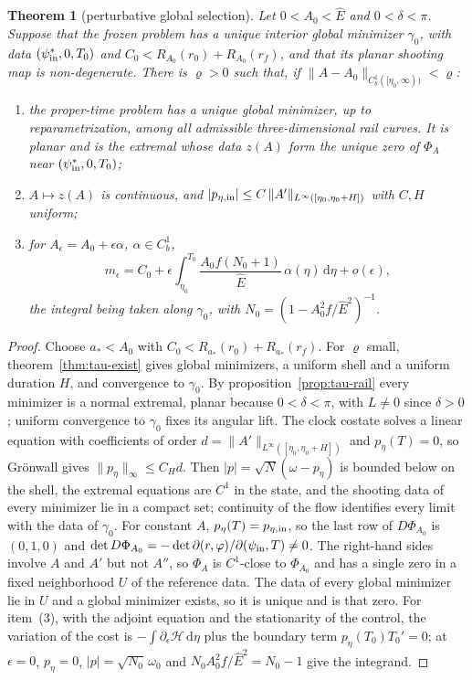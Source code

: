 \documentclass[aip,jmp,amsmath,amssymb,reprint]{revtex4-2}
\newcommand{\Ehat}{\hat E}
\newcommand{\dd}{\mathrm{d}}
\theoremstyle{plain}
\newtheorem{theorem}{Theorem}
\theoremstyle{definition}
\begin{document}
\begin{theorem}[perturbative global selection]\label{thm:tau-P}
Let $0<A_0<\Ehat$ and $0<\delta<\pi$. Suppose that the frozen problem has a unique interior
global minimizer $\gamma_0$, with data $(\psi_{\rm in}^*,0,T_0)$ and
$C_0<R_{A_0}(r_0)+R_{A_0}(r_f)$, and that its planar shooting map is non-degenerate. There is
$\varrho>0$ such that, if $\|A-A_0\|_{C^1_b([\eta_0,\infty))}<\varrho$:
\begin{enumerate}
\item the proper-time problem has a unique global minimizer, up to reparametrization,
  among all admissible three-dimensional rail curves. It is planar and is the extremal
  whose data $z(A)$ form the unique zero of $\Phi_A$ near $(\psi_{\rm in}^*,0,T_0)$;
\item $A\mapsto z(A)$ is continuous, and
  $|p_{\eta,{\rm in}}|\le C\,\|A'\|_{L^\infty([\eta_0,\eta_0+H])}$ with $C,H$ uniform;
\item for $A_\epsilon=A_0+\epsilon\alpha$, $\alpha\in C^1_b$,
  \[
    m_\epsilon=C_0+\epsilon\int_{\eta_0}^{T_0}\frac{A_0f(N_0+1)}{\Ehat}\,\alpha(\eta)\,\dd\eta+o(\epsilon),
  \]
  the integral being taken along $\gamma_0$, with $N_0=(1-A_0^2f/\Ehat^2)^{-1}$.
\end{enumerate}
\end{theorem}

\begin{proof}
Choose $a_*<A_0$ with $C_0<R_{a_*}(r_0)+R_{a_*}(r_f)$. For $\varrho$ small, theorem~\ref{thm:tau-exist}
gives global minimizers, a uniform shell and a uniform duration $H$, and convergence to
$\gamma_0$. By proposition~\ref{prop:tau-rail} every minimizer is a normal extremal, planar
because $0<\delta<\pi$, with $L\neq0$ since $\delta>0$; uniform convergence to $\gamma_0$ fixes
its angular lift. The clock costate solves a linear equation with coefficients of order
$d=\|A'\|_{L^\infty([\eta_0,\eta_0+H])}$ and $p_\eta(T)=0$, so Gr\"onwall gives $\|p_\eta\|_\infty\le C_Hd$.
Then $|p|=\sqrt N(\omega-p_\eta)$ is bounded below on the shell, the extremal equations are $C^1$ in
the state, and the shooting data of every minimizer lie in a compact set; continuity of
the flow identifies every limit with the data of $\gamma_0$. For constant $A$, $p_\eta(T)=p_{\eta,{\rm in}}$,
so the last row of $D\Phi_{A_0}$ is $(0,1,0)$ and
$\det D\Phi_{A_0}=-\det\partial(r,\varphi)/\partial(\psi_{\rm in},T)\neq0$. The right-hand sides
involve $A$ and $A'$ but not $A''$, so $\Phi_A$ is $C^1$-close to $\Phi_{A_0}$ and has a single
zero in a fixed neighborhood $U$ of the reference data. The data of every global minimizer
lie in $U$ and a global minimizer exists, so it is unique and is that zero. For item~(3),
with the adjoint equation and the stationarity of the control, the variation of the cost
is $-\int\partial_\epsilon\mathcal H\,\dd\eta$ plus the boundary term $p_\eta(T_0)T_0'=0$; at $\epsilon=0$,
$p_\eta=0$, $|p|=\sqrt{N_0}\,\omega_0$ and $N_0A_0^2f/\Ehat^2=N_0-1$ give the integrand.
\end{proof}
\end{document}
